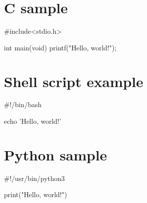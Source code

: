 \documentclass{swfuthesise}
\begin{document}
\section{C sample}

\lipsum[50]

\begin{ccode}
#include<stdio.h>

int main(void)
{
  printf("Hello, world!\n");
}
\end{ccode}

\section{Shell script example}

\lipsum[51]

\begin{shellcode}
  #!/bin/bash

  echo 'Hello, world!'
\end{shellcode}

\section{Python sample}

\lipsum[52]

\begin{pythoncode}
#!/usr/bin/python3

print("Hello, world!")
\end{pythoncode}
\end{document}
